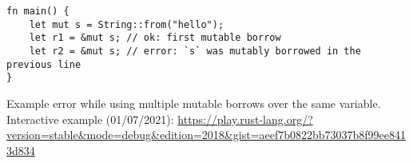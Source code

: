 \begin{listing}
    \begin{verbatim}
fn main() {
    let mut s = String::from("hello");
    let r1 = &mut s; // ok: first mutable borrow
    let r2 = &mut s; // error: `s` was mutably borrowed in the previous line
}
    \end{verbatim}
    \caption{Example error while using multiple mutable borrows over the same variable. Interactive example (01/07/2021): \url{https://play.rust-lang.org/?version=stable&mode=debug&edition=2018&gist=aeef7b0822bb73037b8f99ee8413d834}}
    \label{lst:rust-borrow-n-mut}
\end{listing}